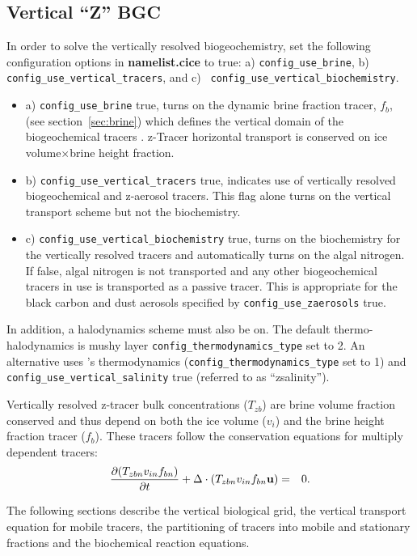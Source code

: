 \subsection{Vertical ``Z'' BGC}
\label{sec:zbgc}
In order to solve the vertically resolved biogeochemistry, set the
following configuration options in {\bf namelist.cice} to true: a)
{\tt config\_use\_brine}, b) {\tt config\_use\_vertical\_tracers}, and
\newline c) {\tt
  config\_use\_vertical\_biochemistry}.
\begin{itemize}
\item a) {\tt config\_use\_brine} true, turns on the dynamic brine
  fraction tracer, $f_b$, (see section~\ref{sec:brine}) which defines the vertical domain of the
  biogeochemical tracers .  z-Tracer horizontal transport is conserved on ice
  volume$\times$brine height fraction.
\item b) {\tt config\_use\_vertical\_tracers} true, indicates use of vertically resolved
  biogeochemical and z-aerosol tracers.  This flag alone turns on the
  vertical transport scheme but not the biochemistry.
\item c) {\tt config\_use\_vertical\_biochemistry} true, turns on the biochemistry for the
  vertically resolved tracers and automatically turns on the algal
  nitrogen. If false, algal nitrogen is not transported and any other biogeochemical tracers in use is
  transported as a passive tracer.  This is appropriate for the black
  carbon and dust aerosols specified by {\tt config\_use\_zaerosols} true.
\end{itemize}
In addition, a halodynamics scheme must also be on.  The default
thermo-halodynamics is mushy layer {\tt config\_thermodynamics\_type} set to 2.  An
alternative uses \cite{Bitz:thermo:1999}'s thermodynamics ({\tt config\_thermodynamics\_type} set
to 1) and {\tt config\_use\_vertical\_salinity} true (referred to as ``zsalinity''). 

Vertically resolved z-tracer bulk concentrations ($T_{zb}$) are  brine volume fraction conserved and thus
depend on both the ice volume ($v_{i}$) and the brine height fraction tracer ($f_b$).   These tracers follow the conservation equations for multiply dependent
tracers:
\begin{eqnarray}
\label{eqn:zbgc_tracer_thickness_cons}
\frac{\partial (T_{zbn} v_{in}f_{bn})}{\partial t} + \Delta \cdot (T_{zbn} v_{in}f_{bn} {\bf u}) & = & 0.
\end{eqnarray}

The following sections describe the vertical biological grid, the
vertical transport equation for mobile tracers, the partitioning of
tracers into  mobile and stationary fractions and the
biochemical reaction equations.
